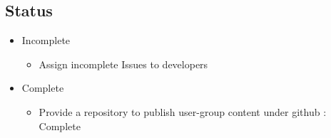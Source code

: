 \documentclass{article}
\begin{document}
\subsection{Status}
    \begin{itemize}
        \item Incomplete
            \begin{itemize}
            \item Assign incomplete Issues to developers
            \end{itemize}
        \item Complete
            \begin{itemize}
            \item Provide a repository to publish user-group content under github : Complete
            \end{itemize}
    \end{itemize}
    
\end{document}
